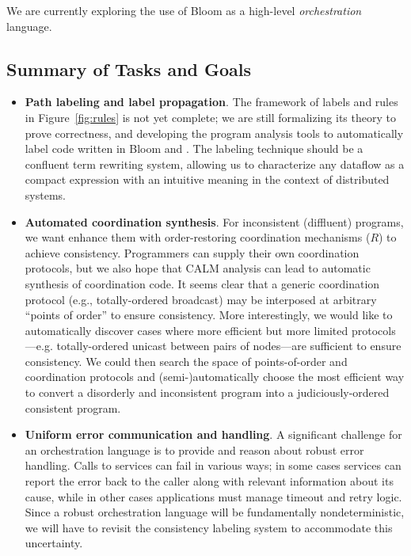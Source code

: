 We are currently exploring the use of Bloom as a high-level \emph{orchestration} language.  

\subsection{Summary of Tasks and Goals}
\begin{itemize}
\item \textbf{Path labeling and label propagation}.
The framework of labels and rules in Figure~\ref{fig:rules} is not yet complete; we are still formalizing its theory to prove correctness, and developing the program analysis tools to automatically label code written in Bloom and \blooml.  The labeling technique should be a confluent term rewriting system, allowing us to 
characterize any dataflow as a compact expression with an intuitive 
meaning in the context of distributed systems.

\item \textbf{Automated coordination synthesis}.
For inconsistent (diffluent) programs, we want enhance them with order-restoring coordination mechanisms ($R$) to achieve consistency.
Programmers can supply their own coordination protocols, but we also hope that CALM analysis can lead to automatic synthesis of coordination code. 
It seems clear that a generic coordination 
protocol (e.g., totally-ordered broadcast) may be interposed at arbitrary 
``points of order''
to ensure consistency.  More interestingly, we would like to automatically discover cases where more efficient but more limited protocols---e.g. totally-ordered unicast between pairs of nodes---are sufficient to ensure consistency.  We could then search the space of points-of-order and coordination protocols and (semi-)automatically choose the most efficient way to convert a disorderly and inconsistent program into a judiciously-ordered consistent program.

\item \textbf{Uniform error communication and handling}.
A significant challenge for an orchestration language is to provide and reason about robust error handling.
Calls to services can fail in various ways; in some cases services can report the error
back to the caller along with relevant information about its cause, while in other cases
applications must manage timeout and retry logic.  Since a robust orchestration language will
be fundamentally nondeterministic, we will have to revisit the consistency labeling system to
accommodate this uncertainty.


\end{itemize}
